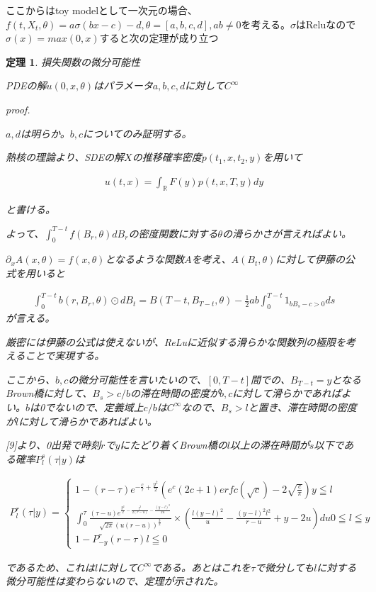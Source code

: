 \documentclass{jsarticle}
\newtheorem{theo}{定理}[section]
\begin{document}
ここからはtoy modelとして一次元の場合、$f(t,X_t,\theta)=a\sigma(bx-c)-d,\theta=[a,b,c,d],ab\neq0$を考える。$\sigma$はReluなので$\sigma(x)=max(0,x)$すると次の定理が成り立つ

\begin{theo} 損失関数の微分可能性

PDEの解$u(0,x,\theta)$はパラメータ$a,b,c,d$に対して$C^\infty$



proof.

$a,d$は明らか。$b,c$についてのみ証明する。

熱核の理論より、SDEの解$X$の推移確率密度$p(t_1,x,t_2,y)$を用いて

\begin{align}
u(t,x)=\int_\mathbb{R}F(y)p(t,x,T,y)dy
\end{align}

と書ける。

よって、$\int_0^{T-t} f(B_r,\theta)dB_r$の密度関数に対する$\theta$の滑らかさが言えればよい。

$\partial_x A(x,\theta)=f(x,\theta)$となるような関数$A$を考え、$A(B_t,\theta)$に対して伊藤の公式を用いると

\begin{align}
\int^{T-t}_0b(r,B_r,\theta)\odot dB_t=B(T-t,B_{T-t},\theta)-\frac{1}{2}ab\int^{T-t}_0 1_{bB_s-c>0}ds
\end{align}
が言える。

厳密には伊藤の公式は使えないが、ReLuに近似する滑らかな関数列の極限を考えることで実現する。


ここから、$b,c$の微分可能性を言いたいので、$[0,T-t]$間での、$B_{T-t}=y$となるBrown橋に対して、$B_s>c/b$の滞在時間の密度が$b,c$に対して滑らかであればよい。$b$は0でないので、定義域上$c/b$は$C^\infty$なので、$B_s>l$と置き、滞在時間の密度が$l$に対して滑らかであればよい。

[9]より、0出発で時刻$r$で$y$にたどり着くBrown橋の$l$以上の滞在時間が$s$以下である確率$P^s_l(\tau|y)$は




\begin{align}
P^r_l(\tau|y)=\begin{cases}
    1-(r-\tau)e^{-\frac{c}{\tau}+\frac{y^2}{2}} (e^c(2c+1)erfc(\sqrt{c})-2\sqrt{\frac{c}{\pi}})　y\leqq l\\
    \int^\tau_0\frac{(\tau-u)e^{\frac{y^2}{2}-\frac{l^2}{2(r-u)}-\frac{(y-l)^2}{2u}}}{\sqrt{2\pi}(u(r-u))^{\frac{3}{2}}}\times (\frac{l(y-l)^2}{u}-\frac{(y-l)^2l^2}{r-u}+y-2u)du　0\leqq l \leqq y\\
    1-P^r_{-y}(r-\tau)　l\leqq 0
\end{cases}
\end{align}

であるため、これは$l$に対して$C^\infty$である。あとはこれを$\tau$で微分しても$l$に対する微分可能性は変わらないので、定理が示された。


\end{theo}
\end{document}

